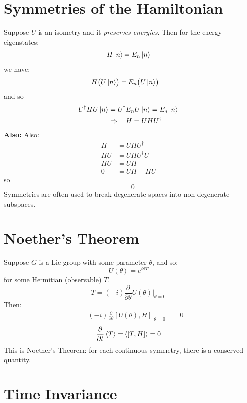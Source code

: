 \documentclass[12pt]{article}
\begin{document}
\section*{Symmetries of the Hamiltonian}

Suppose $U$ is an isometry and it \emph{preserves energies}.  Then for the energy eigenstates:
$$H\ket{n} = E_n\ket{n}$$
we have:
\begin{align*}
  H\bigl(U\ket{n}\bigr)
  &= E_n \bigl(U\ket{n}\bigr)
\end{align*}
and so
\begin{align*}
  U^{\dagger}HU\ket{n} &= U^{\dagger} E_n U\ket{n} = E_n\ket{n} \\
  &\Rightarrow\quad H = UHU^{\dagger}
\end{align*}
\noindent\textbf{Also:}
Also:
\begin{align*}
  H &= UHU^{\dagger}\\
  HU &= UHU^{\dagger}U\\
  HU &= UH \\
  0 &= UH-HU  
\end{align*}
so
\begin{equation*}
  [U, H] = 0
\end{equation*}
Symmetries are often used to break degenerate spaces into
non-degenerate subspaces.

\section*{Noether's Theorem}

Suppose $G$ is a Lie group with some parameter $\theta$, and so:
$$U(\theta) = e^{i\theta T}$$
for some Hermitian (observable) $T$.
\begin{equation*}
  T = (-i)\frac{\partial}{\partial \theta}U(\theta)\Big|_{\theta=0}
\end{equation*}
Then:
\begin{align*}
  [T, H] &= (-i)\frac{\partial}{\partial \theta}[U(\theta),H]\Big|_{\theta=0}
         &= 0
\end{align*}
\begin{equation*}
  \frac{\partial}{\partial t}\braket {T} = \braket{[T,H]} = 0
\end{equation*}
This is Noether's Theorem: for each continuous symmetry, there is a
conserved quantity.

\section*{Time Invariance}
\end{document}
